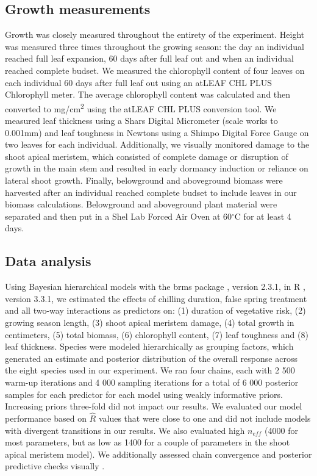\documentclass{article}\usepackage[]{graphicx}\usepackage[]{color}
\begin{document}
\subsection*{Growth measurements}
Growth was closely measured throughout the entirety of the experiment. Height was measured three times throughout the growing season: the day an individual reached full leaf expansion, 60 days after full leaf out and when an individual reached complete budset. We measured the chlorophyll content of four leaves on each individual 60 days after full leaf out using an atLEAF CHL PLUS Chlorophyll meter. The average chlorophyll content was calculated and then converted to mg/cm\textsuperscript{2} using the atLEAF CHL PLUS conversion tool. We measured leaf thickness using a Shars Digital Micrometer (scale works to 0.001mm) and leaf toughness in Newtons using a Shimpo Digital Force Gauge on two leaves for each individual. Additionally, we visually monitored damage to the shoot apical meristem, which consisted of complete damage or disruption of growth in the main stem and resulted in early dormancy induction or reliance on lateral shoot growth. Finally, belowground and aboveground biomass were harvested after an individual reached complete budset to include leaves in our biomass calculations. Belowground and aboveground plant material were separated and then put in a Shel Lab Forced Air Oven at 60$^{\circ}$C for at least 4 days. 

\subsection*{Data analysis}
Using Bayesian hierarchical models with the brms package \citep{brms}, version 2.3.1,  in R \citep{R}, version 3.3.1, we estimated the effects of chilling duration, false spring treatment and all two-way interactions as predictors on: (1) duration of vegetative risk, (2) growing season length, (3) shoot apical meristem damage, (4) total growth in centimeters, (5) total biomass, (6) chlorophyll content, (7) leaf toughness and (8) leaf thickness. Species were modeled hierarchically as grouping factors, which generated an estimate and posterior distribution of the overall response across the eight species used in our experiment. We ran four chains, each with 2 500 warm-up iterations and 4 000 sampling iterations for a total of 6 000 posterior samples for each predictor for each model using weakly informative priors. Increasing priors three-fold did not impact our results. We evaluated our model performance based on $\hat{R}$ values that were close to one and did not include models with divergent transitions in our results. We also evaluated high $n_{eff}$ (4000 for most parameters, but as low as 1400 for a couple of parameters in the shoot apical meristem model). We additionally assessed chain convergence and posterior predictive checks visually \citep{BDA}.
\end{document}
